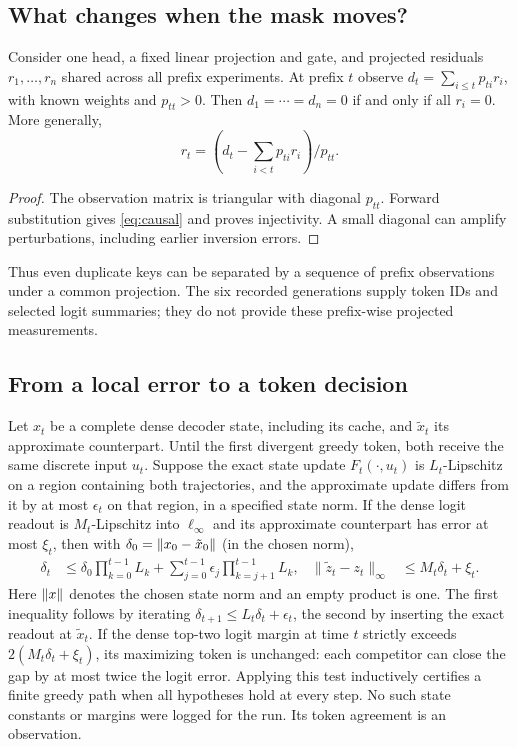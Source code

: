 \subsection{What changes when the mask moves?}
\begin{proposition}\label{prop:causal}
Consider one head, a fixed linear projection and gate, and projected residuals $r_1,\ldots,r_n$ shared across all prefix experiments. At prefix $t$ observe $d_t=\sum_{i\le t}p_{ti}r_i$, with known weights and $p_{tt}>0$. Then $d_1=\cdots=d_n=0$ if and only if all $r_i=0$. More generally,
\begin{equation}
 r_t=(d_t-\sum_{i<t}p_{ti}r_i)/p_{tt}. \label{eq:causal}
\end{equation}
\end{proposition}
\begin{proof}
The observation matrix is triangular with diagonal $p_{tt}$. Forward substitution gives \eqref{eq:causal} and proves injectivity. A small diagonal can amplify perturbations, including earlier inversion errors.
\end{proof}
Thus even duplicate keys can be separated by a sequence of prefix observations under a common projection. The six recorded generations supply token IDs and selected logit summaries; they do not provide these prefix-wise projected measurements.

\subsection{From a local error to a token decision}
Let $x_t$ be a complete dense decoder state, including its cache, and $\tilde x_t$ its approximate counterpart. Until the first divergent greedy token, both receive the same discrete input $u_t$. Suppose the exact state update $F_t(\cdot,u_t)$ is $L_t$-Lipschitz on a region containing both trajectories, and the approximate update differs from it by at most $\epsilon_t$ on that region, in a specified state norm. If the dense logit readout is $M_t$-Lipschitz into $\ell_\infty$ and its approximate counterpart has error at most $\xi_t$, then with $\delta_0=\lVert x_0-\tilde x_0\rVert$ (in the chosen norm),
\begin{align}
 \delta_t &\le
 \delta_0\prod_{k=0}^{t-1}L_k+
 \sum_{j=0}^{t-1}\epsilon_j\prod_{k=j+1}^{t-1}L_k,
 &\|\tilde z_t-z_t\|_\infty&\le M_t\delta_t+\xi_t. \label{eq:state}
\end{align}
Here $\lVert x\rVert$ denotes the chosen state norm and an empty product is one. The first inequality follows by iterating $\delta_{t+1}\le L_t\delta_t+\epsilon_t$, the second by inserting the exact readout at $\tilde x_t$. If the dense top-two logit margin at time $t$ strictly exceeds $2(M_t\delta_t+\xi_t)$, its maximizing token is unchanged: each competitor can close the gap by at most twice the logit error. Applying this test inductively certifies a finite greedy path when all hypotheses hold at every step. No such state constants or margins were logged for the run. Its token agreement is an observation.

